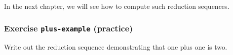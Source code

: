 \begin{fence}
\begin{code}
\AgdaSymbol{(}\AgdaSpace{}%
\AgdaSymbol{(}\AgdaSpace{}%
\AgdaSymbol{(}\AgdaSpace{}%
\AgdaSymbol{)))}\AgdaSpace{}%
\<%
\\
\>[2][@{}l@{\AgdaIndent{0}}]%
\>[4]\AgdaSpace{}%
\AgdaSpace{}%
\AgdaSymbol{(}\AgdaSpace{}%
\AgdaSpace{}%
\AgdaSpace{}%
\AgdaSymbol{)}\<%
\\
%
\>[2]\AgdaSpace{}%
\AgdaSpace{}%
\AgdaSymbol{(}\AgdaSpace{}%
\AgdaSymbol{(}\AgdaSpace{}%
\AgdaSymbol{(}\AgdaSpace{}%
\AgdaSymbol{)))}\AgdaSpace{}%
\<%
\\
\>[2][@{}l@{\AgdaIndent{0}}]%
\>[3]\AgdaSpace{}%
\AgdaSymbol{(}\AgdaSpace{}%
\AgdaSymbol{(}\AgdaSpace{}%
\AgdaSymbol{(}\AgdaSpace{}%
\AgdaSymbol{)))}\<%
\\
%
\>[2]\<%
\end{code}
\end{fence}

In the next chapter, we will see how to compute such reduction
sequences.

\hypertarget{exercise-plus-example-practice}{%
\subsubsection{\texorpdfstring{Exercise \texttt{plus-example}
(practice)}{Exercise plus-example (practice)}}\label{exercise-plus-example-practice}}

Write out the reduction sequence demonstrating that one plus one is two.

\begin{fence}
\begin{code}%
\>[0]\<%
\end{code}
\end{fence}

